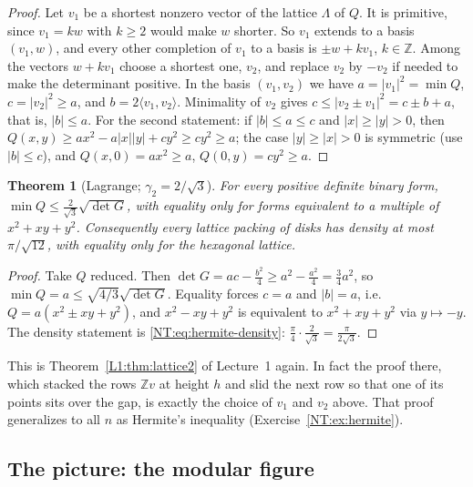 \documentclass[11pt,openany]{book}
\theoremstyle{plain}
\newtheorem{theorem}{Theorem}[chapter]
\theoremstyle{definition}
\theoremstyle{remark}
\newcommand{\Z}{\mathbb{Z}}
\newcommand{\Lat}{\Lambda}             %
\newcommand{\abs}[1]{\left\lvert #1 \right\rvert}
\newcommand{\ip}[2]{\langle #1, #2\rangle}
\begin{document}
\begin{proof}
Let $v_1$ be a shortest nonzero vector of the lattice $\Lat$ of $Q$. It is primitive, since
$v_1=kw$ with $k\ge2$ would make $w$ shorter. So $v_1$ extends to a basis $(v_1,w)$, and every other
completion of $v_1$ to a basis is $\pm w+kv_1$, $k\in\Z$. Among the vectors $w+kv_1$ choose a shortest
one, $v_2$, and replace $v_2$ by $-v_2$ if needed to make the determinant positive. In the basis
$(v_1,v_2)$ we have $a=\abs{v_1}^2=\min Q$, $c=\abs{v_2}^2\ge a$, and $b=2\ip{v_1}{v_2}$. Minimality
of $v_2$ gives $c\le\abs{v_2\pm v_1}^2=c\pm b+a$, that is, $\abs b\le a$. For the second statement:
if $\abs b\le a\le c$ and $\abs x\ge\abs y>0$, then
$Q(x,y)\ge a x^2-a\abs{x}\abs{y}+cy^2\ge cy^2\ge a$; the case $\abs y\ge\abs x>0$ is symmetric
(use $\abs b\le c$), and $Q(x,0)=ax^2\ge a$, $Q(0,y)=cy^2\ge a$.
\end{proof}

\begin{theorem}[Lagrange; $\gamma_2=2/\sqrt3$]\label{NT:thm:gamma2}
For every positive definite binary form, $\min Q\le\frac{2}{\sqrt3}\sqrt{\det G}$, with equality only
for forms equivalent to a multiple of $x^2+xy+y^2$. Consequently every lattice packing of disks has
density at most $\pi/\sqrt{12}$, with equality only for the hexagonal lattice.
\end{theorem}

\begin{proof}
Take $Q$ reduced. Then $\det G=ac-\tfrac{b^2}4\ge a^2-\tfrac{a^2}4=\tfrac34a^2$, so
$\min Q=a\le\sqrt{4/3}\sqrt{\det G}$. Equality forces $c=a$ and $\abs b=a$, i.e.\
$Q=a(x^2\pm xy+y^2)$, and $x^2-xy+y^2$ is equivalent to $x^2+xy+y^2$ via $y\mapsto-y$. The density
statement is \eqref{NT:eq:hermite-density}: $\frac{\pi}{4}\cdot\frac{2}{\sqrt3}=\frac{\pi}{2\sqrt3}$.
\end{proof}

This is Theorem~\ref{L1:thm:lattice2} of Lecture~1 again. In fact the proof there, which stacked the
rows $\Z v$ at height $h$ and slid the next row so that one of its points sits over the gap, is
exactly the choice of $v_1$ and $v_2$ above. That proof generalizes to all $n$ as Hermite's inequality
(Exercise~\ref{NT:ex:hermite}).

\subsection*{The picture: the modular figure}
\end{document}
